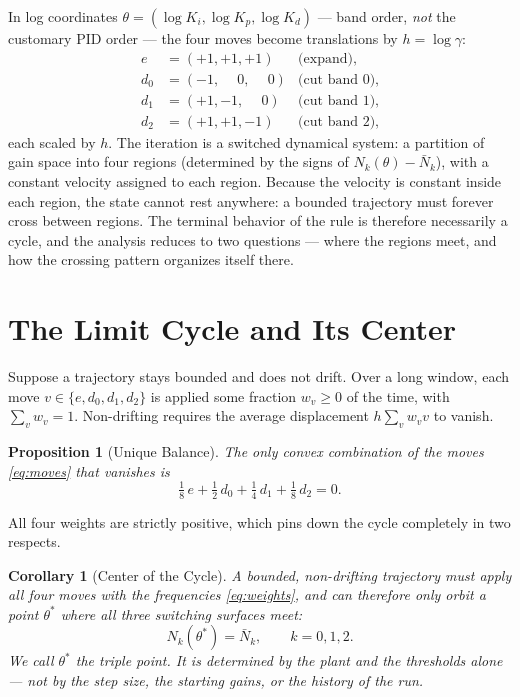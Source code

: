 \documentclass[letterpaper, 10pt, conference, twocolumn]{ieeeconf}
\newtheorem{proposition}{Proposition}
\newtheorem{corollary}{Corollary}
\newcommand{\Nbar}{\bar{N}}
\begin{document}
In log coordinates $\theta = (\log K_i, \log K_p, \log K_d)$ --- band order,
\emph{not} the customary PID order --- the four moves become translations by
$h = \log\gamma$:
\begin{equation}
\begin{aligned}
e   &= (+1, +1, +1) &\text{(expand),}\\
d_0 &= (-1, \phantom{+}0, \phantom{+}0) &\text{(cut band 0),}\\
d_1 &= (+1, -1, \phantom{+}0) &\text{(cut band 1),}\\
d_2 &= (+1, +1, -1) &\text{(cut band 2),}
\end{aligned}
\label{eq:moves}
\end{equation}
each scaled by $h$. The iteration is a switched dynamical system: a partition
of gain space into four regions (determined by the signs of $N_k(\theta) -
\Nbar_k$), with a constant velocity assigned to each region. Because the
velocity is constant inside each region, the state cannot rest anywhere: a
bounded trajectory must forever cross between regions. The terminal behavior
of the rule is therefore necessarily a cycle, and the analysis reduces to two
questions --- where the regions meet, and how the crossing pattern organizes
itself there.

\section{The Limit Cycle and Its Center}
\label{sec:cycle}

Suppose a trajectory stays bounded and does not drift. Over a long window,
each move $v \in \{e, d_0, d_1, d_2\}$ is applied some fraction $w_v \ge 0$ of
the time, with $\sum_v w_v = 1$. Non-drifting requires the average
displacement $h \sum_v w_v v$ to vanish.

\begin{proposition}[Unique Balance]
\label{prop:balance}
The only convex combination of the moves \eqref{eq:moves} that vanishes is
\begin{equation}
\tfrac{1}{8}\, e + \tfrac{1}{2}\, d_0 + \tfrac{1}{4}\, d_1
+ \tfrac{1}{8}\, d_2 = 0.
\label{eq:weights}
\end{equation}
\end{proposition}

All four weights are strictly positive, which pins down the cycle completely
in two respects.

\begin{corollary}[Center of the Cycle]
\label{cor:triple}
A bounded, non-drifting trajectory must apply all four moves with the
frequencies \eqref{eq:weights}, and can therefore only orbit a point
$\theta^*$ where all three switching surfaces meet:
\begin{equation}
N_k(\theta^*) = \Nbar_k, \qquad k = 0, 1, 2.
\label{eq:triplepoint}
\end{equation}
We call $\theta^*$ the \emph{triple point}. It is determined by the plant and
the thresholds alone --- not by the step size, the starting gains, or the
history of the run.
\end{corollary}
\end{document}
